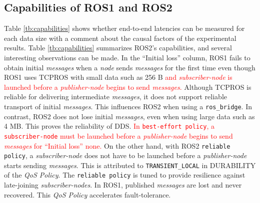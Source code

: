 \documentclass{sig-alternate-05-2015}
\begin{document}
\vspace{-1mm}
\subsection{Capabilities of ROS1 and ROS2}
\label{sec:capacity}

Table \ref{tb:capabilities} shows whether end-to-end latencies can be measured for each data size with a comment about the causal factors of the experimental results.
Table \ref{tb:capabilities} summarizes ROS2's capabilities, and several interesting observations can be made.
In the ``Initial loss'' column, ROS1 fails to obtain initial \emph{messages} when a \emph{node} sends \emph{messages} for the first time even though ROS1 uses TCPROS with small data such as 256 B \textcolor{red}{and \emph{subscriber-node} is launched before a \emph{publisher-node} begins to send \emph{messages}.}
Although TCPROS is reliable for delivering intermediate \emph{messages}, it does not support reliable transport of initial \emph{messages}.
This influences ROS2 when using a \texttt{ros\_bridge}.
In contrast, ROS2 does not lose initial \emph{messages}, even when using large data such as 4 MB.
This proves the reliability of DDS.
\textcolor{red}{In \texttt{best-effort policy}, a \texttt{subscriber-node} must be launched before a \emph{publisher-node} begins to send \emph{messages} for ``Initial loss'' none.}
On the other hand, with ROS2 \texttt{reliable policy}, a \emph{subscriber-node} does not have to be launched before a \emph{publisher-node} starts sending \emph{messages}.
This is attributed to \texttt{TRANSIENT\_LOCAL} in DURABILITY of the \emph{QoS Policy}.
The \texttt{reliable policy} is tuned to provide resilience against late-joining \emph{subscriber-nodes}.
In ROS1, published \emph{messages} are lost and never recovered.
This \emph{QoS Policy} accelerates fault-tolerance.
\end{document}
